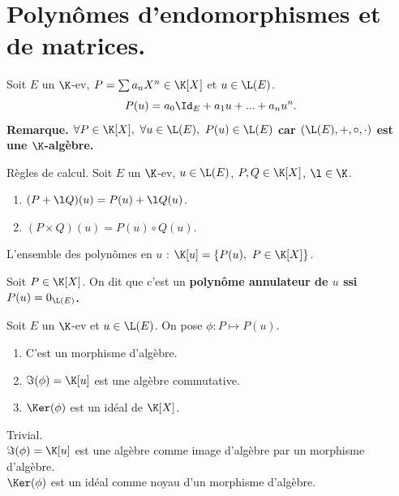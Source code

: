 \documentclass[11pt]{article}
\begin{document}


\thispagestyle{fancy}

\section{Polynômes d'endomorphismes et de matrices.}

\begin{defi}{}{}
    Soit $E$ un $\K$-ev, $P=\sum a_nX^n \in \K[X]$ et $u\in\L(E)$.
    \begin{equation*}
        P(u) = a_0 \Id_E + a_1u + ... + a_nu^n.
    \end{equation*}
    \bf{Remarque.} $\forall P \in \K[X], ~ \forall u \in \L(E), ~ P(u) \in \L(E)$ car $(\L(E),+,\circ,\cdot)$ est une $\K$-algèbre.
\end{defi}

\vspace*{-0.6cm}

\begin{prop}{Règles de calcul.}{}
    Soit $E$ un $\K$-ev, $u\in\L(E)$, $P,Q\in\K[X]$, $\l\in\K$.
    \begin{enumerate}
        \item $(P+\l Q)(u) = P(u) + \l Q(u)$.
        \item $(P\times Q)(u)=P(u)\circ Q(u)$.
    \end{enumerate}
\end{prop}

\vspace*{-0.6cm}

\begin{nota}{}{}
    L'ensemble des polynômes en $u$ : $\K[u]=\{P(u), ~ P\in\K[X]\}$.
\end{nota}

\vspace*{-0.6cm}

\begin{defi}{}{}
    Soit $P\in\K[X]$. On dit que c'est un \bf{polynôme annulateur} de $u$ ssi $P(u)=0_{\L(E)}$.
\end{defi}

\vspace*{-0.6cm}

\begin{thm}{}{}
    Soit $E$ un $\K$-ev et $u\in\L(E)$. On pose $\phi:P\mapsto P(u)$.
    \begin{enumerate}
        \item C'est un morphisme d'algèbre.
        \item $\Im(\phi)=\K[u]$ est une algèbre commutative.
        \item $\Ker(\phi)$ est un idéal de $\K[X]$.
    \end{enumerate}
    \tcblower
     Trivial.\\
     $\Im(\phi)=\K[u]$ est une algèbre comme image d'algèbre par un morphisme d'algèbre.\\
     $\Ker(\phi)$ est un idéal comme noyau d'un morphisme d'algèbre.
\end{thm}
\end{document}
